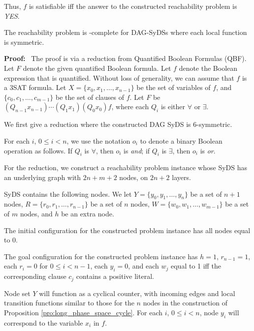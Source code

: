 Thus, $f$ is satisfiable iff the answer to the constructed reachability problem is {\em YES}. 
\QED
\fi

\begin{theorem}\label{thm:reachability-PSPACE}
The reachability problem is \cpsp-complete for DAG-SyDSs
where each local function is symmetric.
\end{theorem}

\noindent
\textbf{Proof:}~ 
The proof is via a reduction from Quantified Boolean Formulas (QBF).
Let $F$ denote the given quantified Boolean formula.
Let $f$ denote the Boolean expression that is quantified.
Without loss of generality, we can assume that $f$ is a 3SAT formula.
Let $X = \{x_0, x_1, \dots , x_{n-1}\}$ be the set of variables of $f$,
and $\{c_0, c_1, \dots , c_{m-1}\}$ be the set of clauses of $f$.
Let $F$ be $(Q_ {n-1} x_{n-1}) \cdots (Q_1 x_1) (Q_0 x_0) f$,
where each $Q_i$ is either $\forall$ or $\exists$.       

We first give a reduction where the constructed DAG SyDS is 6-symmetric.

For each $i$, $0 \leq i <n$,
 we use the notation $o_i$ to denote a binary Boolean operation as follows.
 If $Q_i$ is $\forall$, then $o_i$ is {\em and};
 if $Q_i$ is $\exists$, then $o_i$ is {\em or}.

For the reduction, we construct a reachability problem instance whose SyDS \cals{} 
has an underlying graph with $2n+m+2$ nodes, on $2n+2$ layers. 

SyDS \cals{} contains the following nodes.
We let $Y = \{y_0, y_1, \dots , y_n\}$ be a set of $n+1$ nodes,
$R = \{r_0, r_1, \dots , r_{n-1}\}$ be a set of $n$ nodes,
$W = \{w_0, w_1, \dots , w_{m-1}\}$ be a set of $m$ nodes,
 and $h$ be an extra node.
 
The initial configuration \calc{} for the constructed problem instance
 has all nodes equal to 0.

The goal configuration \cald{} for the constructed problem instance 
has $h =1$, $r_{n-1} = 1$,  each  $r_i= 0$ for $0 \leq i  < n-1$, 
each  $y_i= 0$, 
and each $w_j$ equal to 1 iff the corresponding clause $c_j$ contains a positive literal.

Node set $Y$ will function as a cyclical counter,
with incoming edges and local transition functions similar to those for
the $n$ nodes in the construction of Proposition \ref{pro:long_phase_space_cycle}.
For each $i$, $0 \leq i < n$,
node $y_i$ will correspond to the variable $x_i$ in $f$.

